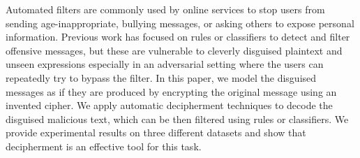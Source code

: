 Automated filters are commonly used by online services to stop users from sending age-inappropriate, bullying messages, or asking others to expose personal information. Previous work has focused on rules or classifiers to detect and filter offensive messages, but these are vulnerable to cleverly disguised plaintext and unseen expressions especially in an adversarial setting where the users can repeatedly try to bypass the filter. In this paper, we model the disguised messages as if they are produced by encrypting the original message using an invented cipher. We apply automatic decipherment techniques to decode the disguised malicious text, which can be then filtered using rules or classifiers. We provide experimental results on three different datasets and show that decipherment is an effective tool for this task.

